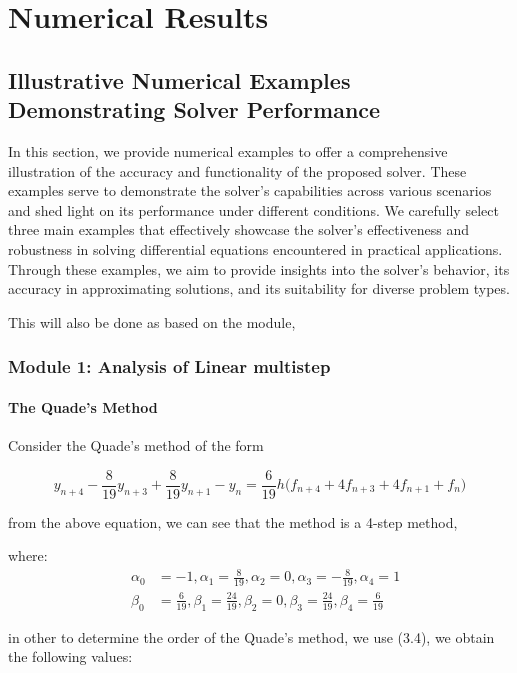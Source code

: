 \chapter{Numerical Results}
\section{Illustrative Numerical Examples Demonstrating Solver Performance}

In this section, we provide numerical examples to offer a comprehensive illustration of the accuracy and functionality of the proposed solver. These examples serve to demonstrate the solver's capabilities across various scenarios and shed light on its performance under different conditions. We carefully select three main examples that effectively showcase the solver's effectiveness and robustness in solving differential equations encountered in practical applications. Through these examples, we aim to provide insights into the solver's behavior, its accuracy in approximating solutions, and its suitability for diverse problem types.

This will also be done as based on the module,


\subsection{Module 1: Analysis of Linear multistep}
\subsubsection{The Quade's Method}
Consider the Quade's method of the form \cite{lambert1977}

\begin{equation}
    y_{n+4} - \frac{8}{19}y_{n+3} + \frac{8}{19}y_{n+1} - y_{n} =  \frac{6}{19}h\bigl(f_{n+4}+4f_{n+3}+4f_{n+1}+f_{n}\bigr)
\end{equation}


from the above equation, we can see that the method is a 4-step method,


where:
\[
\begin{aligned}&\alpha_0 &= -1, \alpha_1 = \frac{8}{19}, \alpha_2 = 0, \alpha_3 = -\frac{8}{19}, \alpha_4 = 1 \\
&\beta_0 &= \frac{6}{19}, \beta_1 = \frac{24}{19}, \beta_2 = 0, \beta_3 = \frac{24}{19}, \beta_4 = \frac{6}{19} 
\end{aligned}
\]

in other to determine the order of the Quade's method, we use (3.4), we obtain the following values:


